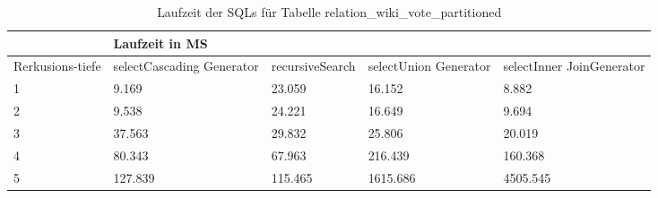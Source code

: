 \begin{table}[H]
	\centering
	\begin{tabular}{l|l|l|l|l|l|}
		\cline{2-6}
		& \multicolumn{5}{|l|}{Laufzeit in MS}                                                                                                                                                  \\ \hline
		\multicolumn{1}{|l|}{\multirow{2}{2cm}{Rerkusions-tiefe}} & \multicolumn{2}{|l|}{\multirow{2}{3cm}{selectCascading Generator}} & \multirow{2}{2.8cm}{recursiveSearch} & \multirow{2}{2.5cm}{selectUnion Generator} & \multirow{2}{2.5cm}{selectInner JoinGenerator} \\
		\multicolumn{1}{|l|}{}
		& \multicolumn{2}{|l|}{}                                           &                                  &                                     &                                           \\ \hline
		
\multicolumn{1}{|l|}{1}                                 & \multicolumn{2}{l|}{9.169}                                       & 23.059                                                & 16.152                                                    & 8.882                                                           \\ \hline
\multicolumn{1}{|l|}{2}                                 & \multicolumn{2}{l|}{9.538}                                       & 24.221                                                & 16.649                                                    & 9.694                                                           \\ \hline
\multicolumn{1}{|l|}{3}                                 & \multicolumn{2}{l|}{37.563}                                      & 29.832                                                & 25.806                                                    & 20.019                                                          \\ \hline
\multicolumn{1}{|l|}{4}                                 & \multicolumn{2}{l|}{80.343}                                      & 67.963                                                & 216.439                                                   & 160.368                                                         \\ \hline
\multicolumn{1}{|l|}{5}                                 & \multicolumn{2}{l|}{127.839}                                     & 115.465                                               & 1615.686                                                  & 4505.545                                                        \\ \hline

		
		
	\end{tabular}
	\caption{Laufzeit der SQLs für Tabelle relation\_wiki\_vote\_partitioned}
\end{table}


